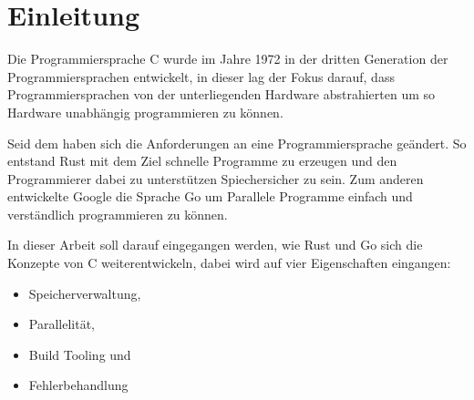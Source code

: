 \section{Einleitung}
\label{sec:Einleitung}

Die Programmiersprache C wurde im Jahre 1972 in der dritten Generation 
der Programmiersprachen entwickelt, in dieser lag der Fokus darauf, dass 
Programmiersprachen von der unterliegenden Hardware abstrahierten um so Hardware 
unabhängig programmieren zu können. \autocite{sharmaShortCommunicationComputer2020}

Seid dem haben sich die Anforderungen an eine Programmiersprache geändert.
So entstand Rust mit dem Ziel schnelle Programme zu erzeugen und den Programmierer
dabei zu unterstützen Spiechersicher zu sein. \autocite{IntroductionRustExample}
Zum anderen entwickelte Google die Sprache Go um Parallele Programme einfach und
verständlich programmieren zu können. \autocite{GoProgrammingLanguage}

In dieser Arbeit soll darauf eingegangen werden, wie Rust und Go sich die 
Konzepte von C weiterentwickeln, dabei wird auf vier Eigenschaften eingangen:
\begin{itemize}
    \item Speicherverwaltung,
    \item Parallelität,
    \item Build Tooling und
    \item Fehlerbehandlung
\end{itemize}
